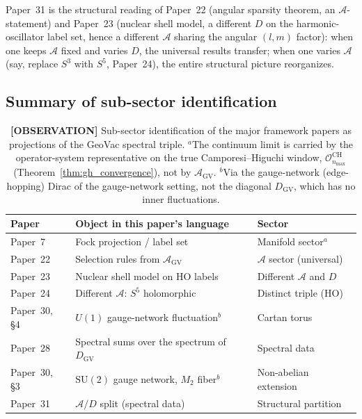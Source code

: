 \documentclass[11pt]{article}
\begin{document}
Paper~31 is the structural reading of Paper~22 (angular sparsity
theorem, an $\mathcal{A}$-statement) and Paper~23 (nuclear shell
model, a different $D$ on the harmonic-oscillator label set, hence a
different $\mathcal{A}$ sharing the angular $(l, m)$ factor): when one
keeps $\mathcal{A}$ fixed and varies $D$, the universal results
transfer; when one varies $\mathcal{A}$ (say, replace $S^3$ with
$S^5$, Paper~24), the entire structural picture reorganizes.

\subsection{Summary of sub-sector identification}

\begin{table}[h]
\centering
\begin{tabular}{lll}
\toprule
Paper & Object in this paper's language & Sector \\
\midrule
Paper~7 & Fock projection / label set & Manifold sector$^{a}$ \\
Paper~22 & Selection rules from $\mathcal{A}_{\mathrm{GV}}$ & $\mathcal{A}$ sector (universal) \\
Paper~23 & Nuclear shell model on HO labels & Different $\mathcal{A}$ and $D$ \\
Paper~24 & Different $\mathcal{A}$: $S^5$ holomorphic & Distinct triple (HO) \\
Paper~30, \S 4 & $U(1)$ gauge-network fluctuation$^{b}$ & Cartan torus \\
Paper~28 & Spectral sums over the spectrum of $D_{\mathrm{GV}}$ & Spectral data \\
Paper~30, \S 3 & $\mathrm{SU}(2)$ gauge network, $M_2$ fiber$^{b}$ & Non-abelian extension \\
Paper~31 & $\mathcal{A}/D$ split (spectral data) & Structural partition \\
\bottomrule
\end{tabular}
\caption{\textbf{[OBSERVATION]} Sub-sector identification of the major framework papers as
projections of the GeoVac spectral triple.  $^{a}$The continuum limit
is carried by the operator-system representative on the true
Camporesi--Higuchi window, $\mathcal{O}^{\mathrm{CH}}_{n_{\max}}$
(Theorem~\ref{thm:gh_convergence}), not by
$\mathcal{A}_{\mathrm{GV}}$.  $^{b}$Via the gauge-network
(edge-hopping) Dirac of the gauge-network setting, not the diagonal
$D_{\mathrm{GV}}$, which has no inner fluctuations.}
\label{tab:subsectors}
\end{table}
\end{document}
